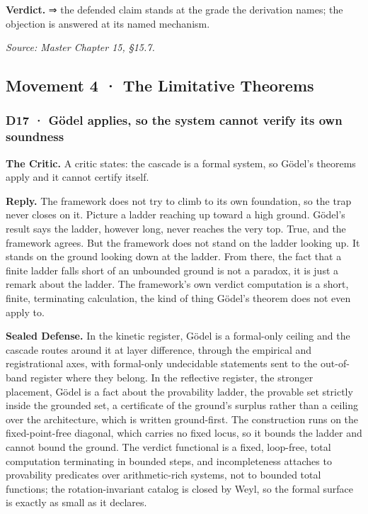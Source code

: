 \documentclass[10pt,twocolumn]{article}
\begin{document}
\textbf{Verdict.} ⇒ the defended claim stands at the grade the
derivation names; the objection is answered at its named mechanism.

\emph{Source: Master Chapter 15, §15.7.}

\hypertarget{movement-4-the-limitative-theorems}{%
\subsection{Movement 4 · The Limitative
Theorems}\label{movement-4-the-limitative-theorems}}

\hypertarget{d17-guxf6del-applies-so-the-system-cannot-verify-its-own-soundness}{%
\subsubsection{D17 · Gödel applies, so the system cannot verify its own
soundness}\label{d17-guxf6del-applies-so-the-system-cannot-verify-its-own-soundness}}

\textbf{The Critic.} A critic states: the cascade is a formal system, so
Gödel's theorems apply and it cannot certify itself.

\textbf{Reply.} The framework does not try to climb to its own
foundation, so the trap never closes on it. Picture a ladder reaching up
toward a high ground. Gödel's result says the ladder, however long,
never reaches the very top. True, and the framework agrees. But the
framework does not stand on the ladder looking up. It stands on the
ground looking down at the ladder. From there, the fact that a finite
ladder falls short of an unbounded ground is not a paradox, it is just a
remark about the ladder. The framework's own verdict computation is a
short, finite, terminating calculation, the kind of thing Gödel's
theorem does not even apply to.

\textbf{Sealed Defense.} In the kinetic register, Gödel is a formal-only
ceiling and the cascade routes around it at layer difference, through
the empirical and registrational axes, with formal-only undecidable
statements sent to the out-of-band register where they belong. In the
reflective register, the stronger placement, Gödel is a fact about the
provability ladder, the provable set strictly inside the grounded set, a
certificate of the ground's surplus rather than a ceiling over the
architecture, which is written ground-first. The construction runs on
the fixed-point-free diagonal, which carries no fixed locus, so it
bounds the ladder and cannot bound the ground. The verdict functional is
a fixed, loop-free, total computation terminating in bounded steps, and
incompleteness attaches to provability predicates over arithmetic-rich
systems, not to bounded total functions; the rotation-invariant catalog
is closed by Weyl, so the formal surface is exactly as small as it
declares.
\end{document}
